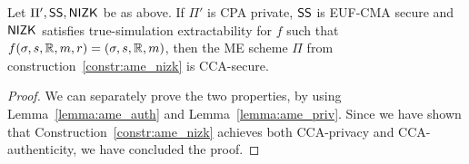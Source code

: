 \begin{theorem}\label{theo:ame_nizk}
    Let $\Pi', \mathsf{SS}, \mathsf{NIZK}$ be as above.
    If $\Pi'$ is CPA private, $\mathsf{SS}$ is EUF-CMA secure and $\mathsf{NIZK}$ satisfies true-simulation extractability for $f$ such that $f(\sigma, s, \mathbb{R}, m, r) = (\sigma, s, \mathbb{R}, m)$, then the ME scheme $\Pi$ from construction~\ref{constr:ame_nizk} is CCA-secure.
\end{theorem}

\begin{proof}
    We can separately prove the two properties, by using Lemma~\ref{lemma:ame_auth} and Lemma~\ref{lemma:ame_priv}.
    Since we have shown that Construction~\ref{constr:ame_nizk} achieves both CCA-privacy and CCA-authenticity, we have concluded the proof.
\end{proof}